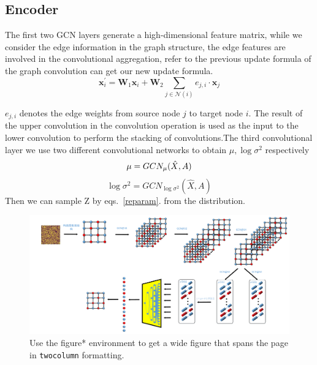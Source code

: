 \documentclass[%
reprint,
amsmath,amssymb,
aps,
]{revtex4-2}
\begin{document}
	\subsection{Encoder}
	The first two GCN layers generate a high-dimensional feature matrix, while we consider the edge information in the graph structure, the edge features are involved in the convolutional aggregation, refer to the previous update formula of the graph convolution can get our new update formula.
	\begin{equation}\label{upgradeFormula}
		\mathbf{x}^{\prime}_i = \mathbf{W}_1 \mathbf{x}_i + \mathbf{W}_2\sum_{j \in \mathcal{N}(i)} e_{j,i} \cdot \mathbf{x}_j
	\end{equation}

	$e_{j,i}$ denotes the edge weights from source node $j$ to target node $i$.
	The result of the upper convolution in the convolution operation is used as the input to the lower convolution to perform the stacking of convolutions.The third convolutional layer we use two different convolutional networks to obtain $\mu,\log{\sigma^2}$ respectively
	\begin{equation}\label{mu}
		\mu = GCN_{\mu}(\hat X,A) \\
	\end{equation}	
	\begin{equation}\label{log}
		\log{\sigma^2} = GCN_{\log{\sigma^2}}(\hat X,A)
	\end{equation}
	Then we can sample Z by eqs.~\ref{reparam}. from the distribution.
	\begin{figure}
		\includegraphics[scale=0.2]{spin_vgae2}
		\caption{\label{fig:wide}Use the figure* environment to get a wide figure that spans the page in \texttt{twocolumn} formatting.}
		\label{fig:spinvgae2}
	\end{figure}
\end{document}
